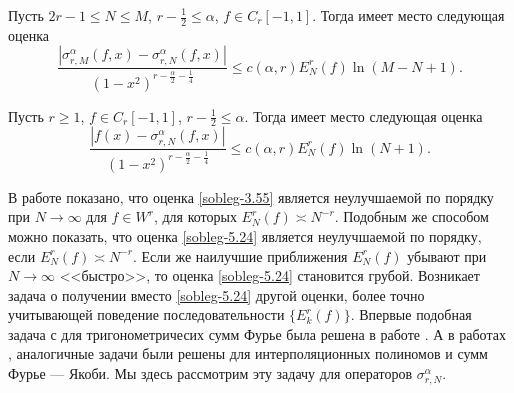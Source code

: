 \begin{lemma} Пусть $2r-1\le N\le M$, $r-\frac12\le\alpha$, $f\in C_r[-1,1]$. Тогда имеет место следующая оценка
\begin{equation}\label{sobleg-5.22}
\frac{|\sigma_{r,M}^\alpha(f,x)-\sigma_{r,N}^\alpha(f,x)|}
{(1-x^2)^{r-\frac{\alpha}{2}-\frac14}}\le
c(\alpha,r)E_N^r(f)\ln(M-N+1).
 \end{equation}
\end{lemma}


\begin{lemma} Пусть $r\ge1$, $f\in C_r[-1,1]$, $r-\frac12\le\alpha$. Тогда имеет место следующая оценка
\begin{equation}\label{sobleg-5.24}
\frac{|f(x)-\sigma_{r,N}^\alpha(f,x)|}
{(1-x^2)^{r-\frac{\alpha}{2}-\frac14}}\le
c(\alpha,r)E_N^r(f)\ln(N+1).
 \end{equation}
\end{lemma}

В работе \cite{sobleg-Shar15} показано, что оценка \eqref{sobleg-3.55}  является неулучшаемой по порядку при $N\to\infty$ для  $f\in W^r$, для которых $E^{r}_{N}(f)\asymp N^{-r}$. Подобным же способом можно показать, что оценка  \eqref{sobleg-5.24} является неулучшаемой по порядку, если $E^{r}_{N}(f)\asymp N^{-r}$.   Если же  наилучшие приближения  $E^{r}_{N}(f)$ убывают при $N\to\infty$ <<быстро>>, то оценка \eqref{sobleg-5.24}   становится грубой. Возникает задача о получении вместо \eqref{sobleg-5.24} другой оценки, более точно учитывающей поведение последовательности  $\{E^{r}_{k}(f)\}$. Впервые подобная задача с для тригонометричесих сумм Фурье была решена в работе \cite{sobleg-OSK}. А в работах \cite{sobleg-sharap1}, \cite{sobleg-sharap2} аналогичные задачи были решены для интерполяционных полиномов и сумм Фурье --- Якоби. Мы здесь рассмотрим  эту задачу  для операторов $\sigma_{r,N}^\alpha$.

